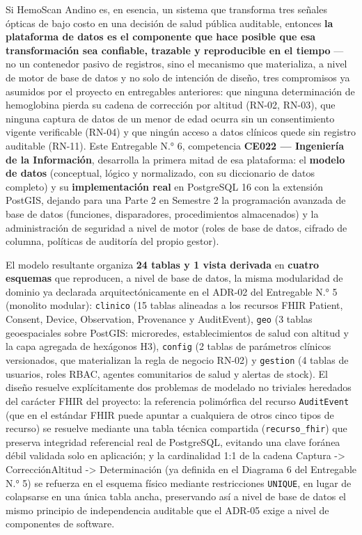 \documentclass[11pt,a4paper]{article}
\begin{document}
Si HemoScan Andino es, en esencia, un sistema que transforma tres señales ópticas de bajo costo en una decisión de salud pública auditable, entonces \textbf{la plataforma de datos es el componente que hace posible que esa transformación sea confiable, trazable y reproducible en el tiempo} --- no un contenedor pasivo de registros, sino el mecanismo que materializa, a nivel de motor de base de datos y no solo de intención de diseño, tres compromisos ya asumidos por el proyecto en entregables anteriores: que ninguna determinación de hemoglobina pierda su cadena de corrección por altitud (RN-02, RN-03), que ninguna captura de datos de un menor de edad ocurra sin un consentimiento vigente verificable (RN-04) y que ningún acceso a datos clínicos quede sin registro auditable (RN-11). Este Entregable N.° 6, competencia \textbf{CE022 --- Ingeniería de la Información}, desarrolla la primera mitad de esa plataforma: el \textbf{modelo de datos} (conceptual, lógico y normalizado, con su diccionario de datos completo) y su \textbf{implementación real} en PostgreSQL 16 con la extensión PostGIS, dejando para una Parte 2 en Semestre 2 la programación avanzada de base de datos (funciones, disparadores, procedimientos almacenados) y la administración de seguridad a nivel de motor (roles de base de datos, cifrado de columna, políticas de auditoría del propio gestor).

El modelo resultante organiza \textbf{24 tablas y 1 vista derivada} en \textbf{cuatro esquemas} que reproducen, a nivel de base de datos, la misma modularidad de dominio ya declarada arquitectónicamente en el ADR-02 del Entregable N.° 5 (monolito modular): \texttt{clinico} (15 tablas alineadas a los recursos FHIR Patient, Consent, Device, Observation, Provenance y AuditEvent), \texttt{geo} (3 tablas geoespaciales sobre PostGIS: microredes, establecimientos de salud con altitud y la capa agregada de hexágonos H3), \texttt{config} (2 tablas de parámetros clínicos versionados, que materializan la regla de negocio RN-02) y \texttt{gestion} (4 tablas de usuarios, roles RBAC, agentes comunitarios de salud y alertas de stock). El diseño resuelve explícitamente dos problemas de modelado no triviales heredados del carácter FHIR del proyecto: la referencia polimórfica del recurso \texttt{AuditEvent} (que en el estándar FHIR puede apuntar a cualquiera de otros cinco tipos de recurso) se resuelve mediante una tabla técnica compartida (\texttt{recurso\_fhir}) que preserva integridad referencial real de PostgreSQL, evitando una clave foránea débil validada solo en aplicación; y la cardinalidad 1:1 de la cadena Captura -\textgreater{} CorrecciónAltitud -\textgreater{} Determinación (ya definida en el Diagrama 6 del Entregable N.° 5) se refuerza en el esquema físico mediante restricciones \texttt{UNIQUE}, en lugar de colapsarse en una única tabla ancha, preservando así a nivel de base de datos el mismo principio de independencia auditable que el ADR-05 exige a nivel de componentes de software.
\end{document}
